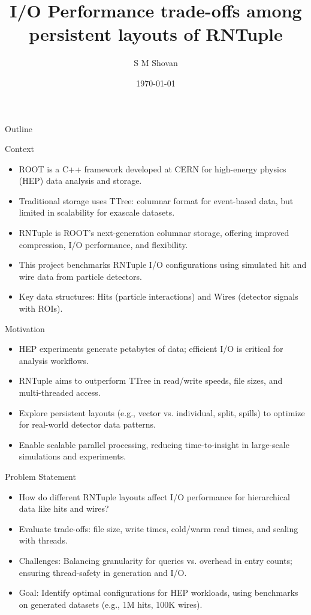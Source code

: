\documentclass[aspectratio=169]{beamer}
\title{I/O Performance trade-offs among persistent layouts of RNTuple }
\subtitle{}
\author{S M Shovan}
\institute{Fermilab National Laboratory}
\date{\today}
\begin{document}
\maketitle

\begin{frame}{Outline}
\tableofcontents
\end{frame}

\begin{frame}{Context}
  \begin{itemize}
    \item ROOT is a C++ framework developed at CERN for high-energy physics (HEP) data analysis and storage.
    \item Traditional storage uses TTree: columnar format for event-based data, but limited in scalability for exascale datasets.
    \item RNTuple is ROOT's next-generation columnar storage, offering improved compression, I/O performance, and flexibility.
    \item This project benchmarks RNTuple I/O configurations using simulated hit and wire data from particle detectors.
    \item Key data structures: Hits (particle interactions) and Wires (detector signals with ROIs).
  \end{itemize}
\end{frame}

\begin{frame}{Motivation}
  \begin{itemize}
    \item HEP experiments generate petabytes of data; efficient I/O is critical for analysis workflows.
    \item RNTuple aims to outperform TTree in read/write speeds, file sizes, and multi-threaded access.
    \item Explore persistent layouts (e.g., vector vs. individual, split, spills) to optimize for real-world detector data patterns.
    \item Enable scalable parallel processing, reducing time-to-insight in large-scale simulations and experiments.
  \end{itemize}
\end{frame}

\begin{frame}{Problem Statement}
  \begin{itemize}
    \item How do different RNTuple layouts affect I/O performance for hierarchical data like hits and wires?
    \item Evaluate trade-offs: file size, write times, cold/warm read times, and scaling with threads.
    \item Challenges: Balancing granularity for queries vs. overhead in entry counts; ensuring thread-safety in generation and I/O.
    \item Goal: Identify optimal configurations for HEP workloads, using benchmarks on generated datasets (e.g., 1M hits, 100K wires).
  \end{itemize}
\end{frame}
\end{document}
